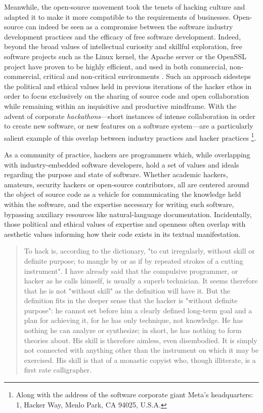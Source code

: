 Meanwhile, the open-source movement took the tenets of hacking culture and adapted it to make it more compatible to the requirements of businesses. Open-source can indeed be seen as a compromise between the software industry development practices and the efficacy of free software development. Indeed, beyond the broad values of intellectual curiosity and skillful exploration, free software projects such as the Linux kernel, the Apache server or the OpenSSL project have proven to be highly efficient, and used in both commercial, non-commercial, critical and non-critical environments \citep{raymond_cathedral_2001}. Such an approach sidesteps the political and ethical values held in previous iterations of the hacker ethos in order to focus exclusively on the sharing of source code and open collaboration while remaining within an inquisitive and productive mindframe. With the advent of corporate \emph{hackathons}—short instances of intense collaboration in order to create new software, or new features on a software system—are a particularly salient example of this overlap between industry practices and hacker practices \citep{nolte_you_2018}\footnote{Along with the address of the software corporate giant Meta's headquarters: 1, Hacker Way, Menlo Park, CA 94025, U.S.A.}.

As a community of practice, hackers are programmers which, while overlapping with industry-embedded software developers, hold a set of values and ideals regarding the purpose and state of software. Whether academic hackers, amateurs, security hackers or open-source contributors, all are centered around the object of source code as a vehicle for communicating the knowledge held within the software, and the expertise necessary for writing such software, bypassing auxiliary resources like natural-language documentation. Incidentally, those political and ethical values of expertise and openness often overlap with aesthetic values informing how their code exists in its textual manifestation.

\spacer

\begin{quote}
  To hack is, according to the dictionary, "to cut irregularly, without skill or definite purpose; to mangle by or as if by repeated strokes of a cutting instrument". I have already said that the compulsive programmer, or hacker as he calls himself, is usually a superb technician. It seems therefore that he is not "without skill" as the definition will have it. But the definition fits in the deeper sense that the hacker is "without definite purpose": he cannot set before him a clearly defined long-term goal and a plan for achieving it, for he has only technique, not knowledge. He has nothing he can analyze or synthesize; in short, he has nothing to form theories about. His skill is therefore aimless, even disembodied. It is simply not connected with anything other than the instrument on which it may be exercised. His skill is that of a monastic copyist who, though illiterate, is a first rate calligrapher. \citep{weizenbaum_computer_1976}
\end{quote}

